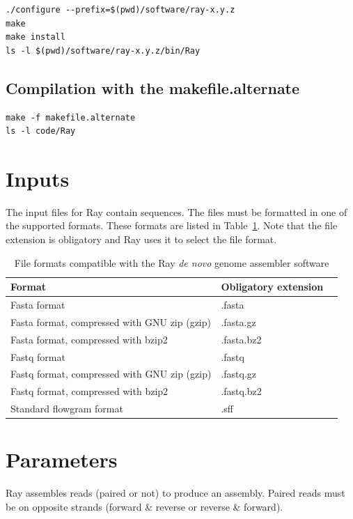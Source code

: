 \documentclass{article}
\begin{document}
\begin{verbatim}
./configure --prefix=$(pwd)/software/ray-x.y.z
make
make install
ls -l $(pwd)/software/ray-x.y.z/bin/Ray
\end{verbatim}


\subsection{Compilation with the makefile.alternate}

\begin{verbatim}
make -f makefile.alternate
ls -l code/Ray
\end{verbatim}

\section{Inputs}

The input files for Ray contain sequences. The files must be formatted in one of the supported formats.
These formats are listed in Table~\ref{formats}. Note that the file extension is obligatory and Ray uses it
to select the file format.

\begin{table}[h]
\caption{File formats compatible with the Ray \emph{de novo} genome assembler software}\label{formats}
\begin{tabular}{lll}
\hline
Format & Obligatory extension \\
\hline
Fasta format & .fasta\\
Fasta format, compressed with GNU zip (gzip) & .fasta.gz \\
Fasta format, compressed with bzip2 & .fasta.bz2 \\
Fastq format & .fastq\\
Fastq format, compressed with GNU zip (gzip) & .fastq.gz \\
Fastq format, compressed with bzip2 & .fastq.bz2 \\
Standard flowgram format & .sff \\
\hline
\end{tabular}
\end{table}



\section{Parameters}

Ray assembles reads (paired or not) to produce an assembly.
Paired reads must be on opposite strands (forward \& reverse or reverse \& forward).
\end{document}
